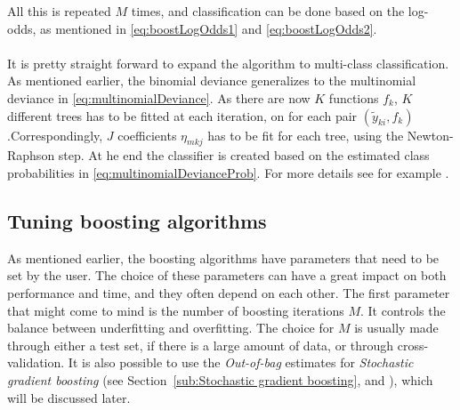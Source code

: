 All this is repeated $M$ times, and classification can be done based on the log-odds, as mentioned in \eqref{eq:boostLogOdds1} and \eqref{eq:boostLogOdds2}. \\
\\
It is pretty straight forward to expand the algorithm to multi-class classification. As mentioned earlier, the binomial deviance generalizes to the multinomial deviance in \eqref{eq:multinomialDeviance}. As there are now $K$ functions $f_k$, $K$ different trees has to be fitted at each iteration, on for each pair $(\tilde y_{k i}, f_k)$.Correspondingly, $J$ coefficients $\eta_{m k j}$ has to be fit for each tree, using the Newton-Raphson step. At he end the classifier is created based on the estimated class probabilities in \eqref{eq:multinomialDevianceProb}. For more details see for example \cite{friedman}.

\subsection{Tuning boosting algorithms}
\label{sub:Tuning boosting algorithms}
As mentioned earlier, the boosting algorithms have parameters that need to be set by the user. The choice of these parameters can have a great impact on both performance and time, and they often depend on each other. The first parameter that might come to mind is the number of boosting iterations $M$. It controls the balance between underfitting and overfitting. The choice for $M$ is usually made through either a test set, if there is a large amount of data, or through cross-validation. It is also possible to use the \textit{Out-of-bag} estimates for  \textit{Stochastic gradient boosting} (see Section~\ref{sub:Stochastic gradient boosting}, and ), which will be discussed later. 

